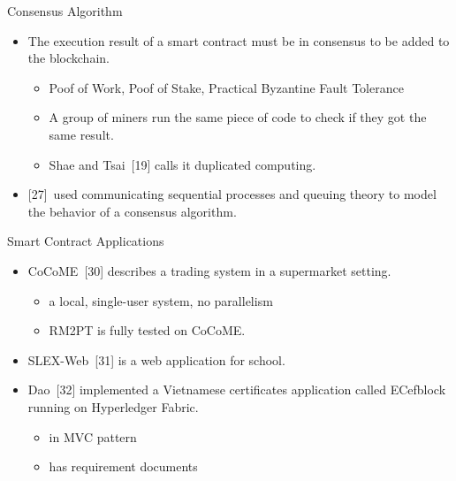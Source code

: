 \documentclass[xcolor=svgnames]{beamer}
\begin{document}
\begin{frame}[t]{Consensus Algorithm}
\begin{itemize}
\item The execution result of a smart contract must be in consensus to be added to the blockchain.


\begin{itemize}
\item<2-> Poof of Work, Poof of Stake, Practical Byzantine Fault Tolerance
\item<2-> A group of miners run the same piece of code to check if they got the same result.
\item<3-> Shae and Tsai~[19] calls it duplicated computing.
\end{itemize}

\item<4-> {[27]}~used communicating sequential processes and queuing theory to model the behavior of a consensus algorithm.
\end{itemize}

\end{frame}

\begin{frame}{Smart Contract Applications}
\begin{itemize}
\item CoCoME~[30] describes a trading system in a supermarket setting.
	\begin{itemize}
	\item a local, single-user system, no parallelism
	\item RM2PT is fully tested on CoCoME.
	\end{itemize}

\item SLEX-Web~[31] is a web application for school.
\item Dao~[32] implemented a Vietnamese certificates application called ECefblock running on Hyperledger Fabric.
	\begin{itemize}
	\item in MVC pattern
	\item has requirement documents
	\end{itemize}
\end{itemize}
\end{frame}
\end{document}
